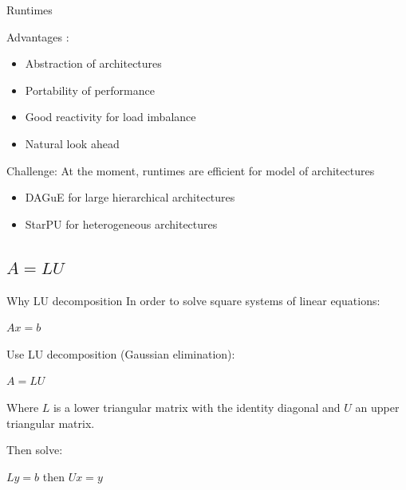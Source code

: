 \begin{frame}{Runtimes}
\begin{exampleblock}{Advantages :}
\begin{itemize}
\item Abstraction of architectures
\item Portability of performance
\item Good reactivity for load imbalance
\item Natural look ahead
\end{itemize}
\end{exampleblock}{}
\pause
\begin{exampleblock}{Challenge:}
At the moment, runtimes are efficient for model of architectures
\begin{itemize}
\item DAGuE for large hierarchical architectures
\item StarPU for heterogeneous architectures
\end{itemize}
\end{exampleblock}{}
\end{frame}

\subsection{$A=LU$}

\begin{frame}{Why LU decomposition}
In order to solve square systems of linear equations:
\begin{center}
$Ax=b$
\end{center}
Use LU decomposition (Gaussian elimination):
\begin{center}
$A=LU$
\end{center}
Where $L$ is a lower triangular matrix with the identity diagonal and $U$ an upper triangular matrix.

Then solve:
\begin{center}
$Ly=b$ then $Ux=y$
\end{center}
\end{frame}

